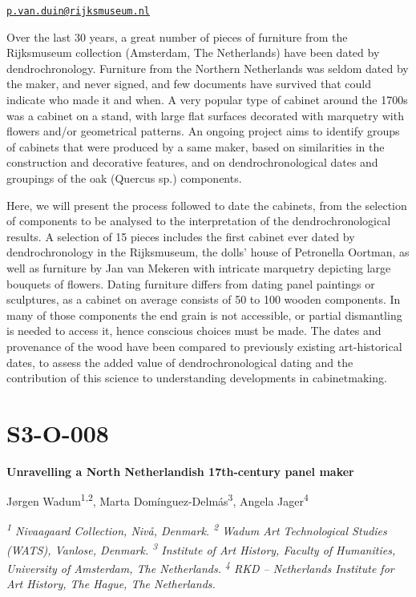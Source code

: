\documentclass[
]{book}
\begin{document}
\href{mailto:p.van.duin@rijksmuseum.nl}{\nolinkurl{p.van.duin@rijksmuseum.nl}}

Over the last 30 years, a great number of pieces of furniture from the Rijksmuseum collection (Amsterdam, The Netherlands) have been dated by dendrochronology. Furniture from the Northern Netherlands was seldom dated by the maker, and never signed, and few documents have survived that could indicate who made it and when. A very popular type of cabinet around the 1700s was a cabinet on a stand, with large flat surfaces decorated with marquetry with flowers and/or geometrical patterns. An ongoing project aims to identify groups of cabinets that were produced by a same maker, based on similarities in the construction and decorative features, and on dendrochronological dates and groupings of the oak (Quercus sp.) components.

Here, we will present the process followed to date the cabinets, from the selection of components to be analysed to the interpretation of the dendrochronological results. A selection of 15 pieces includes the first cabinet ever dated by dendrochronology in the Rijksmuseum, the dolls' house of Petronella Oortman, as well as furniture by Jan van Mekeren with intricate marquetry depicting large bouquets of flowers. Dating furniture differs from dating panel paintings or sculptures, as a cabinet on average consists of 50 to 100 wooden components. In many of those components the end grain is not accessible, or partial dismantling is needed to access it, hence conscious choices must be made. The dates and provenance of the wood have been compared to previously existing art-historical dates, to assess the added value of dendrochronological dating and the contribution of this science to understanding developments in cabinetmaking.

\hypertarget{s3-o-008}{%
\section*{S3-O-008}\label{s3-o-008}}

\textbf{Unravelling a North Netherlandish 17th-century panel maker}

Jørgen Wadum\textsuperscript{1,2}, Marta Domínguez-Delmás\textsuperscript{3}, Angela Jager\textsuperscript{4}

\emph{\textsuperscript{1} Nivaagaard Collection, Nivå, Denmark. \textsuperscript{2} Wadum Art Technological Studies (WATS), Vanlose, Denmark. \textsuperscript{3} Institute of Art History, Faculty of Humanities, University of Amsterdam, The Netherlands. \textsuperscript{4} RKD -- Netherlands Institute for Art History, The Hague, The Netherlands.}
\end{document}
